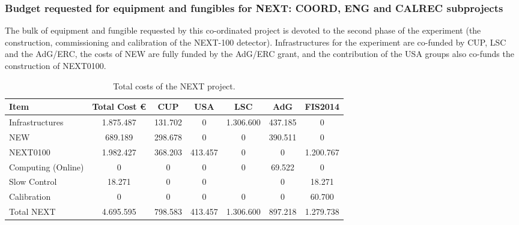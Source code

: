 \subsubsection*{Budget requested for equipment and fungibles for NEXT: COORD, ENG and CALREC subprojects}

The bulk of equipment and fungible requested by this co-ordinated project is devoted to the second phase of the experiment (the construction, commissioning and calibration of the NEXT-100 detector). 
 Infrastructures for the experiment are co-funded by CUP, LSC and the AdG/ERC, the costs of NEW are fully funded by the AdG/ERC grant, and the contribution of the USA groups also co-funds the construction of NEXT0100. 

\begin{table}[h!]
\begin{center}
\begin{tabular}{|l|c|c|c|c|c|c|}
\hline
 Item & Total Cost \euro & CUP	&USA &	LSC & AdG &	FIS2014 \\
 \hline
Infrastructures 	& 1.875.487 & 	131.702 & 	0 &	1.306.600 &	437.185 &	0 \\
NEW &	 689.189 & 	298.678 & 	0 &	0 &	390.511 &	0 \\	
NEXT0100	 &1.982.427 & 	368.203 &	413.457 &	0 &	0 &	1.200.767 \\
Computing (Online) & 0 & 0 & 	0 &	0 &	69.522 &	0 	\\
Slow Control & 18.271 & 	0 &	0 &	 &	0 & 18.271	\\
Calibration &	 0 & 	0 &	0 &	0 &	0  & 60.700	\\
 \hline
Total  NEXT &	 4.695.595 & 	798.583 &	413.457 &	1.306.600 &	897.218 &	1.279.738 \\
 \hline\hline
\end{tabular}  
\caption{Total costs of the NEXT project.}
\label{tab.TCOSTS}
\end{center}
\end{table} 


